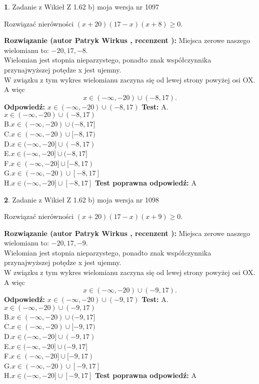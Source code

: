 \documentclass[12pt, a4paper]{article}
\theoremstyle{definition} %
\newtheorem{zad}{}
\newcommand{\zadStart}[1]{\begin{zad}#1\newline}
\newcommand{\zadStop}{\end{zad}}
\newcommand{\rozwStart}[2]{\noindent \textbf{Rozwiązanie (autor #1 , recenzent #2): }\newline}
\newcommand{\rozwStop}{\newline}
\newcommand{\odpStart}{\noindent \textbf{Odpowiedź:}\newline}
\newcommand{\odpStop}{\newline}
\newcommand{\testStart}{\noindent \textbf{Test:}\newline}
\newcommand{\testStop}{\newline}
\newcommand{\kluczStart}{\noindent \textbf{Test poprawna odpowiedź:}\newline}
\newcommand{\kluczStop}{\newline}
\begin{document}
\zadStart{Zadanie z Wikieł Z 1.62 b) moja wersja nr 1097}

Rozwiązać nierówności $(x+20)(17-x)(x+8)\ge0$.
\zadStop
\rozwStart{Patryk Wirkus}{}
Miejsca zerowe naszego wielomianu to: $-20, 17, -8$.\\
Wielomian jest stopnia nieparzystego, ponadto znak współczynnika przy\linebreak najwyższej potędze x jest ujemny.\\ W związku z tym wykres wielomianu zaczyna się od lewej strony powyżej osi OX. A więc $$x \in (-\infty,-20) \cup (-8,17).$$
\rozwStop
\odpStart
$x \in (-\infty,-20) \cup (-8,17)$
\odpStop
\testStart
A.$x \in (-\infty,-20) \cup (-8,17)$\\
B.$x \in (-\infty,-20) \cup (-8,17]$\\
C.$x \in (-\infty,-20) \cup [-8,17)$\\
D.$x \in (-\infty,-20] \cup (-8,17)$\\
E.$x \in (-\infty,-20] \cup (-8,17]$\\
F.$x \in (-\infty,-20] \cup [-8,17)$\\
G.$x \in (-\infty,-20) \cup [-8,17]$\\
H.$x \in (-\infty,-20] \cup [-8,17]$
\testStop
\kluczStart
A
\kluczStop



\zadStart{Zadanie z Wikieł Z 1.62 b) moja wersja nr 1098}

Rozwiązać nierówności $(x+20)(17-x)(x+9)\ge0$.
\zadStop
\rozwStart{Patryk Wirkus}{}
Miejsca zerowe naszego wielomianu to: $-20, 17, -9$.\\
Wielomian jest stopnia nieparzystego, ponadto znak współczynnika przy\linebreak najwyższej potędze x jest ujemny.\\ W związku z tym wykres wielomianu zaczyna się od lewej strony powyżej osi OX. A więc $$x \in (-\infty,-20) \cup (-9,17).$$
\rozwStop
\odpStart
$x \in (-\infty,-20) \cup (-9,17)$
\odpStop
\testStart
A.$x \in (-\infty,-20) \cup (-9,17)$\\
B.$x \in (-\infty,-20) \cup (-9,17]$\\
C.$x \in (-\infty,-20) \cup [-9,17)$\\
D.$x \in (-\infty,-20] \cup (-9,17)$\\
E.$x \in (-\infty,-20] \cup (-9,17]$\\
F.$x \in (-\infty,-20] \cup [-9,17)$\\
G.$x \in (-\infty,-20) \cup [-9,17]$\\
H.$x \in (-\infty,-20] \cup [-9,17]$
\testStop
\kluczStart
A
\kluczStop
\end{document}
